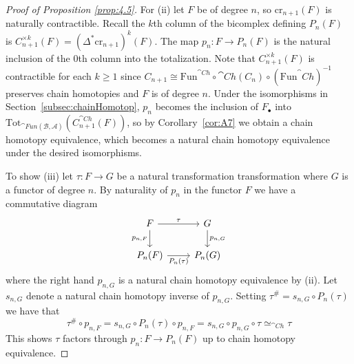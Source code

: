 \begin{proof}[Proof of Proposition \ref{prop:4.5}]
    \vspace{10pt}

    For (ii) let $F$ be of degree $n$, so $\text{cr}_{n+1}(F)$ is naturally contractible. Recall the $k$th column of the bicomplex defining $P_n(F)$ is $C_{n+1}^{\times k}(F) = (\Delta^*\text{cr}_{n+1})^k(F)$. The map $p_n:F\rightarrow P_n(F)$ is the natural inclusion of the $0$th column into the totalization. Note that $C_{n+1}^{\times k}(F)$ is contractible for each $k\geq 1$ since $C_{n+1}\cong \text{Fun}^{\cat{Ch}}\circ \cat{Ch}(C_n)\circ (\text{Fun}^\cat{Ch})^{-1}$ preserves chain homotopies and $F$ is of degree $n$. Under the isomorphisms in Section~\ref{subsec:chainHomotop}, $p_n$ becomes the inclusion of $F_\bullet$ into $\text{Tot}_{\cat{Fun}(\mathcal{B},\mathcal{A})}(C_{n+1}^{\cat{Ch}}(F))$, so by Corollary~\ref{cor:A7} we obtain a chain homotopy equivalence, which becomes a natural chain homotopy equivalence under the desired isomorphisms.

    \vspace{10pt}

    To show (iii) let $\tau:F\rightarrow G$ be a natural transformation transformation where $G$ is a functor of degree $n$. By naturality of $p_n$ in the functor $F$ we have a commutative diagram
    \[\begin{tikzcd}
    	F & G \\
    	{P_n(F)} & {P_n(G)}
    	\arrow["\tau", from=1-1, to=1-2]
    	\arrow["{P_n(\tau)}"', from=2-1, to=2-2]
    	\arrow["{p_{n,F}}"', from=1-1, to=2-1]
    	\arrow["{p_{n,G}}", from=1-2, to=2-2]
    \end{tikzcd}\]
    where the right hand $p_{n,G}$ is a natural chain homotopy equivalence by (ii). Let $s_{n,G}$ denote a natural chain homotopy inverse of $p_{n,G}$. Setting $\tau^\# = s_{n,G}\circ P_n(\tau)$ we have that
    \begin{equation*}
        \tau^\#\circ p_{n,F} = s_{n,G}\circ P_n(\tau)\circ p_{n,F} = s_{n,G}\circ p_{n,G}\circ \tau \simeq_{\cat{Ch}} \tau
    \end{equation*}
    This shows $\tau$ factors through $p_n:F\rightarrow P_n(F)$ up to  chain homotopy equivalence. 
    

\end{proof}
